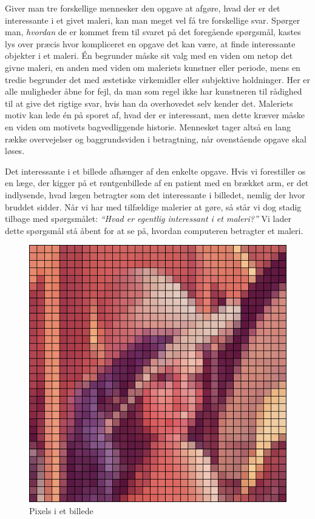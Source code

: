 {
Giver man tre forskellige mennesker den opgave at afgøre, hvad der er
det interessante i et givet maleri, kan man meget vel få tre forskellige
svar. Spørger man, \emph{hvordan} de er kommet frem til svaret på det
foregående spørgsmål, kastes lys over præcis hvor kompliceret en opgave
det kan være, at finde interessante objekter i et maleri. Én begrunder
måske sit valg med en viden om netop det givne maleri, en anden med
viden om maleriets kunstner eller periode, mens en tredie begrunder det
med æstetiske virkemidler eller subjektive holdninger. Her er alle
muligheder åbne for fejl, da man som regel ikke har kunstneren til
rådighed til at give det rigtige svar, hvis han da overhovedet selv
kender det.  Maleriets motiv kan lede én på sporet af, hvad der er
interessant, men dette kræver måske en viden om motivets bagvedliggende
historie.  Mennesket tager altså en lang række overvejelser og
baggrundsviden i betragtning, når ovenstående opgave skal løses.

Det interessante i et billede afhænger af den enkelte opgave.  Hvis vi
forestiller os en læge, der kigger på et røntgenbillede af en patient
med en brækket arm, er det indlysende, hvad lægen betragter som det
interessante i billedet, nemlig der hvor bruddet sidder. Når vi har med
tilfældige malerier at gøre, så står vi dog stadig tilbage med
spørgsmålet: \emph{``Hvad er egentlig \emph{interessant} i et maleri?''}
Vi lader dette spørgsmål stå åbent for at se på, hvordan computeren
betragter et maleri.

\begin{figure}[h]
    \centering
    \includegraphics[scale=0.3]{afsnit/baggrund/billeder/pixel_lena}
    \caption[]{Pixels i et billede}
    \label{pixel_lena}
\end{figure}

}
